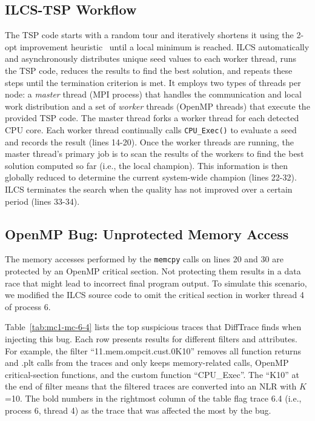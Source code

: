 \subsection{ILCS-TSP Workflow}

The TSP code starts with a random tour and iteratively shortens it using the 2-opt improvement heuristic~\cite{2-opt} until a local minimum is reached. ILCS automatically and asynchronously distributes unique seed values to each worker thread, runs the TSP code, reduces the results to find the best solution, and repeats these steps until the termination criterion is met. It employs two types of threads per node: a \textit{master} thread (MPI process) that handles the communication and local work distribution and a set of \textit{worker} threads (OpenMP threads) that execute the provided TSP code. The master thread forks a worker thread for each detected CPU core.
%
Each worker thread continually calls
\texttt{CPU\_Exec()} to evaluate a seed and records the result (lines 14-20).
%
Once the worker threads are running, the master thread's primary job is to scan the results of the workers to find the best solution computed so far (i.e., the local champion). This information is then globally reduced to determine the current system-wide champion (lines 22-32).
%
ILCS terminates the search when the quality has not improved over a certain period (lines 33-34).



\subsection{OpenMP Bug: Unprotected Memory Access}

The memory accesses performed by the \texttt{memcpy} calls on lines 20 and 30 are protected by an OpenMP critical section.
%
Not protecting them results in a data race that might lead to incorrect final program output.
%
To simulate this scenario, we modified the ILCS source code to omit the critical section in worker thread 4 of process 6.

Table~\ref{tab:mc1-mc-6-4} lists the top suspicious traces that DiffTrace finds when injecting this bug.
%
Each row presents results for different filters and attributes.
%
For example, the filter ``11.mem.ompcit.cust.0K10'' removes all function returns and .plt calls from the traces and only keeps memory-related calls, OpenMP critical-section functions, and the custom function ``CPU\_Exec''.
%
The ``K10'' at the end of filter means that the filtered traces are converted into an NLR with $K$=10.
%
%
The bold numbers in the rightmost column of the table flag trace 6.4 (i.e., process 6, thread 4) as the trace that was affected the most by the bug.
%

